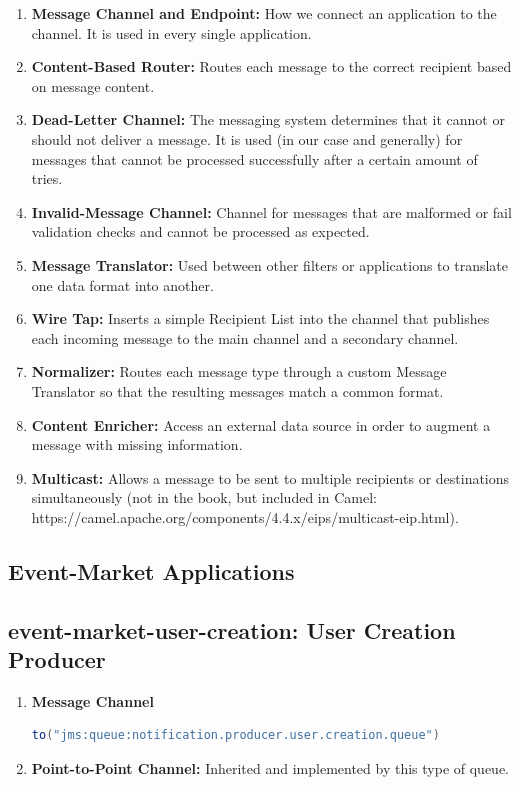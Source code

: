 \documentclass{article}
\begin{document}
\begin{enumerate}
    \item \textbf{Message Channel and Endpoint:} How we connect an application to the channel. It is used in every single application.
    \item \textbf{Content-Based Router:} Routes each message to the correct recipient based on message content.
    \item \textbf{Dead-Letter Channel:} The messaging system determines that it cannot or should not deliver a message. It is used (in our case and generally) for messages that cannot be processed successfully after a certain amount of tries.
    \item \textbf{Invalid-Message Channel:} Channel for messages that are malformed or fail validation checks and cannot be processed as expected.
    \item \textbf{Message Translator:} Used between other filters or applications to translate one data format into another.
    \item \textbf{Wire Tap:} Inserts a simple Recipient List into the channel that publishes each incoming message to the main channel and a secondary channel.
    \item \textbf{Normalizer:} Routes each message type through a custom Message Translator so that the resulting messages match a common format.
    \item \textbf{Content Enricher:} Access an external data source in order to augment a message with missing information.
    \item \textbf{Multicast:} Allows a message to be sent to multiple recipients or destinations simultaneously (not in the book, but included in Camel: https://camel.apache.org/components/4.4.x/eips/multicast-eip.html).
\end{enumerate}

\FloatBarrier
\subsection{Event-Market Applications}

\subsection{event-market-user-creation: User Creation Producer}
\begin{enumerate}
    \item \textbf{Message Channel}
\begin{lstlisting}[language=Java, caption={Message Channel for User Creation}]
to("jms:queue:notification.producer.user.creation.queue")
\end{lstlisting}
    \item \textbf{Point-to-Point Channel:} Inherited and implemented by this type of queue.
\end{enumerate}
\end{document}
